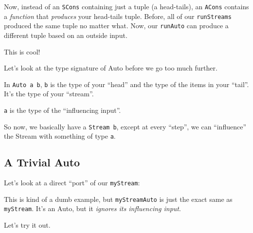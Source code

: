 \documentclass[]{article}
\newenvironment{Shaded}{}{}
\newcommand{\KeywordTok}[1]{\textcolor[rgb]{0.00,0.44,0.13}{\textbf{{#1}}}}
\newcommand{\DataTypeTok}[1]{\textcolor[rgb]{0.56,0.13,0.00}{{#1}}}
\newcommand{\DecValTok}[1]{\textcolor[rgb]{0.25,0.63,0.44}{{#1}}}
\newcommand{\OtherTok}[1]{\textcolor[rgb]{0.00,0.44,0.13}{{#1}}}
\newcommand{\FunctionTok}[1]{\textcolor[rgb]{0.02,0.16,0.49}{{#1}}}
\newcommand{\NormalTok}[1]{{#1}}
\begin{document}
Now, instead of an \texttt{SCons} containing just a tuple (a
head-tails), an \texttt{ACons} contains a \emph{function} that
\emph{produces} your head-tails tuple. Before, all of our
\texttt{runStreams} produced the same tuple no matter what. Now, our
\texttt{runAuto} can produce a different tuple based on an outside
input.

This is cool!

Let's look at the type signature of Auto before we go too much further.

In \texttt{Auto\ a\ b}, \texttt{b} is the type of your ``head'' and the
type of the items in your ``tail''. It's the type of your ``stream''.

\texttt{a} is the type of the ``influencing input''.

So now, we basically have a \texttt{Stream\ b}, except at every
``step'', we can ``influence'' the Stream with something of type
\texttt{a}.

\subsection{A Trivial Auto}\label{a-trivial-auto}

Let's look at a direct ``port'' of our \texttt{myStream}:

\begin{Shaded}
\end{Shaded}

This is kind of a dumb example, but \texttt{myStreamAuto} is just the
exact same as \texttt{myStream}. It's an Auto, but it \emph{ignores its
influencing input}.

Let's try it out.
\end{document}
